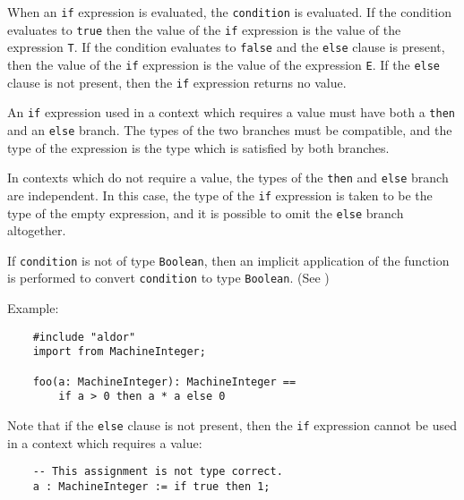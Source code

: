 When an \verb"if" expression is evaluated, the \verb"condition" is evaluated.
If the condition evaluates to \verb"true" then the value of the \verb"if"
expression is the value of the expression \verb"T".
If the condition evaluates to \verb"false" and the \verb"else" clause
is present, then the value of the \verb"if" expression is the value
of the expression \verb"E".
If the \verb"else" clause is not present, then the \verb"if" expression
returns no value.

An {\tt if} expression used in a context which requires a value must
have both a {\tt then} and an {\tt else} branch.  The types of the two
branches must be compatible, and the type of the expression is the
type which is satisfied by both branches.

In contexts which do not require a value,
the types of the {\tt then} and {\tt else} branch
are independent.   In this case, the type of the {\tt if} expression
is taken to be the type of the empty expression, and it is possible
to omit the {\tt else} branch altogether.


If \verb"condition" is not of type \verb"Boolean", then an implicit
application of the function  is performed to convert
\verb"condition" to type \verb"Boolean".  (See )

Example:

\begin{small}
\begin{verbatim}
    #include "aldor"
    import from MachineInteger;

    foo(a: MachineInteger): MachineInteger ==
        if a > 0 then a * a else 0
\end{verbatim}
\end{small}

Note that if the \verb"else" clause is not present, then the \verb"if"
expression cannot be used in a context which requires a value:

\begin{small}
\begin{verbatim}
    -- This assignment is not type correct.
    a : MachineInteger := if true then 1;
\end{verbatim}
\end{small}

\clearpage

